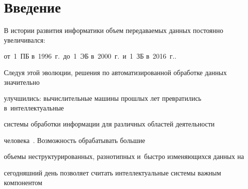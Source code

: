        























      \thispagestyle{headings}


      




        





\section{Введение}


\label{sect:00}










В истории развития информатики объем передаваемых данных постоянно увеличивался: 


от~1~ПБ в~1996~г.\ до~1~ЭБ в~2000~г.\ и~1~ЗБ в~2016~г.\cite{cisco_zettabyte}. 


Следуя этой эволюции, решения по автоматизированной обработке данных значительно 


улучшились: вычислительные машины прошлых лет превратились в~интеллектуальные 


системы обработки информации для различных областей деятельности 


человека~\cite{big_data_finance, big_data_heathcare}. Возможность обрабатывать большие 


объемы неструктурированных, разнотипных и~быстро изменяющихся данных на 


сегодняшний день позволяет считать интеллектуальные системы важным компонентом 


